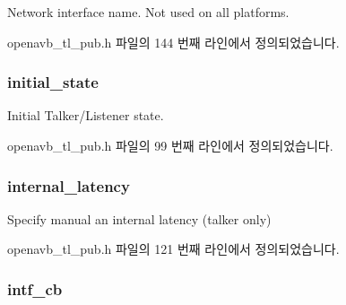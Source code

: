 Network interface name. Not used on all platforms. 



openavb\+\_\+tl\+\_\+pub.\+h 파일의 144 번째 라인에서 정의되었습니다.

\subsubsection[{\texorpdfstring{initial\+\_\+state}{initial_state}}]{ initial\+\_\+state}\hypertarget{structopenavb__tl__cfg__t_af00cb7d534b8d163f482aacb7bf9661d}{}\label{structopenavb__tl__cfg__t_af00cb7d534b8d163f482aacb7bf9661d}


Initial Talker/\+Listener state. 



openavb\+\_\+tl\+\_\+pub.\+h 파일의 99 번째 라인에서 정의되었습니다.

\subsubsection[{\texorpdfstring{internal\+\_\+latency}{internal_latency}}]{ internal\+\_\+latency}\hypertarget{structopenavb__tl__cfg__t_a770b9a7e3ef496ca3269c2005f12fa81}{}\label{structopenavb__tl__cfg__t_a770b9a7e3ef496ca3269c2005f12fa81}


Specify manual an internal latency (talker only) 



openavb\+\_\+tl\+\_\+pub.\+h 파일의 121 번째 라인에서 정의되었습니다.

\subsubsection[{\texorpdfstring{intf\+\_\+cb}{intf_cb}}]{ intf\+\_\+cb}\hypertarget{structopenavb__tl__cfg__t_a93f5e2efe8b8bbdac95c0beca4a2e236}{}\label{structopenavb__tl__cfg__t_a93f5e2efe8b8bbdac95c0beca4a2e236}


